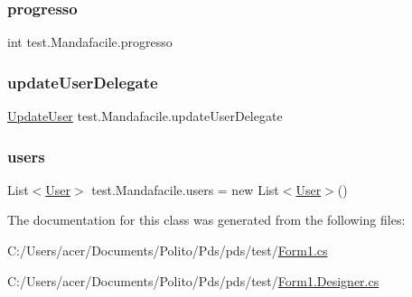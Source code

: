 \subsubsection{\texorpdfstring{progresso}{progresso}}
{\footnotesize\ttfamily int test.\+Mandafacile.\+progresso\hspace{0.3cm}{\ttfamily [static]}}

\mbox{\label{classtest_1_1_mandafacile_a8e3576435cdf537453765a8809c82f6b}} 
\subsubsection{\texorpdfstring{update\+User\+Delegate}{updateUserDelegate}}
{\footnotesize\ttfamily \hyperlink{classtest_1_1_mandafacile_a314bfe1e315b47325030221b65112ed1}{Update\+User} test.\+Mandafacile.\+update\+User\+Delegate}

\mbox{\label{classtest_1_1_mandafacile_a9c4b7d85a2f3f10751fd5e304213eea2}} 
\subsubsection{\texorpdfstring{users}{users}}
{\footnotesize\ttfamily List$<$\hyperlink{classtest_1_1_user}{User}$>$ test.\+Mandafacile.\+users = new List$<$\hyperlink{classtest_1_1_user}{User}$>$()}



The documentation for this class was generated from the following files\+:\begin{DoxyCompactItemize}
\item 
C\+:/\+Users/acer/\+Documents/\+Polito/\+Pds/pds/test/\hyperlink{_form1_8cs}{Form1.\+cs}\item 
C\+:/\+Users/acer/\+Documents/\+Polito/\+Pds/pds/test/\hyperlink{_form1_8_designer_8cs}{Form1.\+Designer.\+cs}\end{DoxyCompactItemize}

